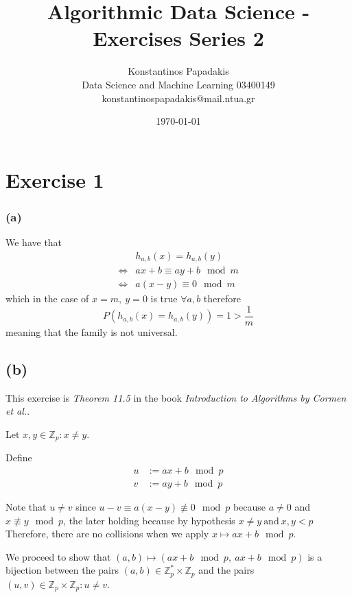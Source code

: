 \documentclass{article}
\title{Algorithmic Data Science - Exercises Series 2}
\author{
    Konstantinos Papadakis\\
    Data Science and Machine Learning 03400149\\
    konstantinospapadakis@mail.ntua.gr
}
\date{\today}
\begin{document}
\maketitle

\newpage
\section*{Exercise 1}

\subsubsection*{(a)}
We have that 
\begin{align*}
    &h_{a,b}(x) = h_{a,b}(y)\\
    \iff& ax + b \equiv ay + b \mod{m}\\
    \iff& a(x-y) \equiv 0 \mod{m}
\end{align*}
which in the case of \(x=m, \  y = 0\) is true \(\forall a, b\)
therefore
\[P(h_{a,b}(x) = h_{a,b}(y)) = 1 > \frac{1}{m}\]
meaning that the family is not universal.

\subsection*{(b)}

This exercise is \emph{Theorem 11.5} in the book \emph{Introduction to Algorithms by Cormen et al.}.

Let \(x, y \in \mathbb{Z}_p: x \neq y\).

Define
\begin{align*}
    u &:= ax + b \mod{p}\\
    v &:= ay + b \mod{p}
\end{align*}

Note that \(u \neq v\)
since \(u - v \equiv a (x - y) \not\equiv 0 \mod{p}\)
because \(a \neq 0\) and \(x \not\equiv y \mod{p}\),
the later holding because by hypothesis \(x \neq y \ \textrm{and}\ x,y < p\)
Therefore, there are no collisions when we apply \(x \mapsto ax + b \mod{p}\).

We proceed to show that
\((a, b) \mapsto (ax + b \mod{p},\ ax + b \mod{p})\) is a bijection between
the pairs \((a, b) \in \mathbb{Z}_p^* \times \mathbb{Z}_p\)
and the pairs \((u, v) \in \mathbb{Z}_p \times \mathbb{Z}_p: u \neq v\).
\end{document}
